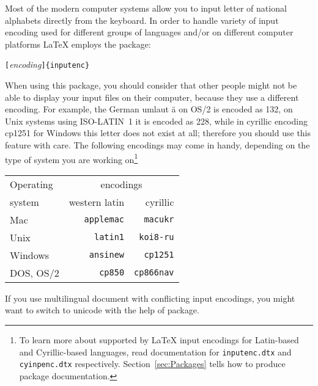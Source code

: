 \newcommand{\ieih}[1]{%
\index{encodings!input!#1@\texttt{#1}}%
\index{input encodings!#1@\texttt{#1}}%
\index{#1@\texttt{#1}}}
\newcommand{\iei}[1]{%
\ieih{#1}\texttt{#1}}
\newcommand{\feih}[1]{%
\index{encodings!font!#1@\texttt{#1}}%
\index{font encodings!#1@\texttt{#1}}%
\index{#1@\texttt{#1}}}
\newcommand{\fei}[1]{%
\feih{#1}\texttt{#1}}

Most of the modern computer systems allow you to input letter of
national alphabets  directly from the keyboard. In order to 
handle variety of input encoding used for different groups of 
languages and/or on different computer platforms \LaTeX{} employs the
 package:
\begin{lscommand}
\verb|[|\emph{encoding}\verb|]{inputenc}| 
\end{lscommand}

When using this package, you should consider that other people might not
be able to display your input files on their computer, because they use
a different encoding. For example, the German umlaut \"a on OS/2 is
encoded as 132, on Unix systems using ISO-LATIN~1 it is encoded as 228,
while in cyrillic encoding cp1251 for Windows this letter does not exist
at all; therefore you should use this feature with care. The following
encodings may come in handy, depending on the type of system you are
working on\footnote{To learn more about supported by \LaTeX{}  input
encodings for Latin-based and Cyrillic-based languages,  read
documentation for \texttt{inputenc.dtx} and \texttt{cyinpenc.dtx}
respectively. Section~\ref{sec:Packages} tells how to produce package
documentation.}

\begin{center}
\begin{tabular}{l | r | r }
Operating & \multicolumn{2}{c}{encodings}\\
system  & western latin      & cyrillic\\
\hline
Mac     &  \iei{applemac} & \iei{macukr}  \\
Unix    &  \iei{latin1}   & \iei{koi8-ru}  \\ 
Windows &  \iei{ansinew}  & \iei{cp1251}    \\
DOS, OS/2  &  \iei{cp850} & \iei{cp866nav}
\end{tabular}                
\end{center}                 

If you use multilingual document with conflicting input encodings, 
you might want to switch to unicode with the help of  package. 

